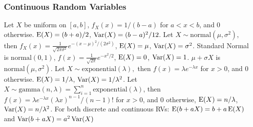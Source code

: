 \subsubsection*{Continuous Random Variables}
 Let $X$ be uniform on $[a,b]$, $f_X(x) = 1/(b-a)$ for $a < x < b$, and 0 otherwise. $\operatorname{E}(X) = (b+a)/2$, $\operatorname{Var}(X) = (b-a)^2/12$.
 Let $X \sim \mathrm{normal}(\mu, \sigma^2)$, then $f_X(x) = \frac{1}{\sqrt{2\pi\sigma^2}}e^{-(x-\mu)^2/(2\sigma^2)}$, $\operatorname{E}(X) = \mu$, $\operatorname{Var}(X) = \sigma^2$.
 Standard Normal is $\mathrm{normal}(0,1)$, $f(x) = \frac{1}{\sqrt{2\pi}}e^{-x^2/2}$, $\operatorname{E}(X) = 0$, $\operatorname{Var}(X) = 1$. $\mu + \sigma X$ is $\mathrm{normal}(\mu, \sigma^2)$.
 Let $X \sim \mathrm{exponential}(\lambda),$ then $f(x) = \lambda e^{-\lambda x}$ for $x > 0$, and $0$ otherwise. $\operatorname{E}(X) = 1/\lambda$, $\operatorname{Var}(X) = 1/\lambda^2$.
 Let $X \sim \mathrm{gamma}(n,\lambda) = \sum^n_{i=1} \mathrm{exponential}(\lambda)$, then $f(x) = \lambda e^{-\lambda x}(\lambda x)^{n-1}/(n-1)!$ for $x > 0$, and 0 otherwise, $\operatorname{E}(X) =n/\lambda$, $\operatorname{Var}(X) = n/\lambda^2$.
 For both discrete and continuous RVs: $\operatorname{E}(b + aX) = b+a\operatorname{E}(X)$ and $\operatorname{Var}(b+aX) = a^2\operatorname{Var}(X)$
